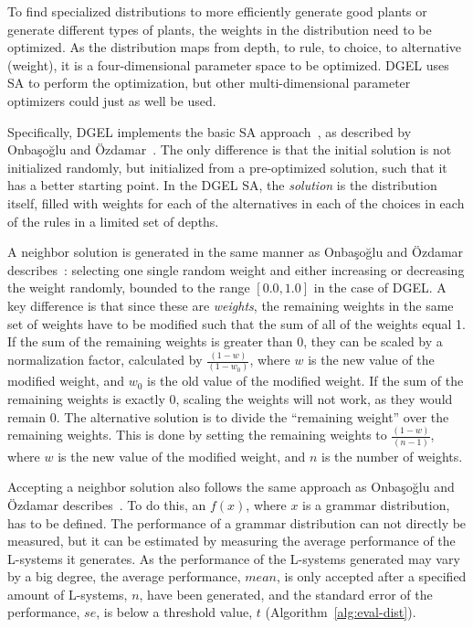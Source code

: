 To find specialized distributions to more efficiently generate good plants or generate different types of plants, the weights in the distribution need to be optimized.
As the distribution maps from depth, to rule, to choice, to alternative (weight), it is a four-dimensional parameter space to be optimized.
\gls{DGEL} uses \gls{SA} to perform the optimization, but other multi-dimensional parameter optimizers could just as well be used.

Specifically, \gls{DGEL} implements the basic \gls{SA} approach~\cite{2000Ozdamar}, as described by Onbaşoğlu and Özdamar~\cite{2001Onbasoglu}.
The only difference is that the initial solution is not initialized randomly, but initialized from a pre-optimized solution, such that it has a better starting point.
In the \gls{DGEL} \gls{SA}, the \textit{solution} is the distribution itself, filled with weights for each of the alternatives in each of the choices in each of the rules in a limited set of depths.

A neighbor solution is generated in the same manner as Onbaşoğlu and Özdamar describes~\cite{2001Onbasoglu}: selecting one single random weight and either increasing or decreasing the weight randomly, bounded to the range $[0.0, 1.0]$ in the case of \gls{DGEL}.
A key difference is that since these are \textit{weights}, the remaining weights in the same set of weights have to be modified such that the sum of all of the weights equal 1.
If the sum of the remaining weights is greater than 0, they can be scaled by a normalization factor, calculated by $\frac{(1 - w)}{(1 - w_0)}$, where $w$ is the new value of the modified weight, and $w_0$ is the old value of the modified weight.
If the sum of the remaining weights is exactly 0, scaling the weights will not work, as they would remain 0.
The alternative solution is to divide the ``remaining weight'' over the remaining weights.
This is done by setting the remaining weights to $\frac{(1 - w)}{(n - 1)}$, where $w$ is the new value of the modified weight, and $n$ is the number of weights.

Accepting a neighbor solution also follows the same approach as Onbaşoğlu and Özdamar describes~\cite{2001Onbasoglu}.
To do this, an $f(x)$, where $x$ is a grammar distribution, has to be defined.
The performance of a grammar distribution can not directly be measured, but it can be estimated by measuring the average performance of the \glspl{L-system} it generates.
As the performance of the \glspl{L-system} generated may vary by a big degree, the average performance, $mean$, is only accepted after a specified amount of \glspl{L-system}, $n$, have been generated, and the standard error of the performance, $se$, is below a threshold value, $t$ (Algorithm~\ref{alg:eval-dist}).

